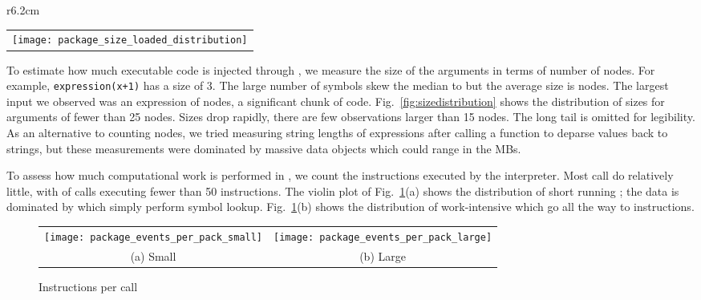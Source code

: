 \documentclass[review,screen,acmsmall]{acmart}%
\renewcommand{\k}[1]{\lstinline |#1|\xspace}
\begin{document}
\begin{wrapfigure}{r}{6.2cm}
\begin{tabular}{c}
{\hspace{-25mm}\texttt{[image: package\_size\_loaded\_distribution]}}
\end{tabular}
\caption{Loaded code} \label{fig:sizedistribution}
\end{wrapfigure}

To estimate how much executable code is injected through \eval, we measure the
size of the arguments in terms of number of nodes. For example,
\k{expression(x+1)} has a size of 3. The large number of symbols skew the median
to \packageMedianszeval but the average size is \packageAvgszeval nodes. The
largest \eval input we observed was an expression of \packageMaxszeval nodes, a
significant chunk of code. Fig.~\ref{fig:sizedistribution} shows the
distribution of sizes for arguments of fewer than 25 nodes. Sizes drop rapidly,
there are few observations larger than 15 nodes. The long tail is omitted for
legibility. As an alternative to counting nodes, we tried measuring string
lengths of expressions after calling a function to deparse values back to
strings, but these measurements were dominated by massive data objects which
could range in the MBs.

To assess how much computational work is performed in \evals, we count the
instructions executed by the interpreter. Most call do relatively little, with
\packageSmalleventspct of calls executing fewer than 50 instructions. The violin
plot of Fig.~\ref{ev}(a) shows the distribution of short running \evals; the
data is dominated by \evals which simply perform symbol lookup. Fig.~\ref{ev}(b)
shows the distribution of work-intensive \evals which go all the way to
\packageMaxeventsRnd instructions.

\begin{figure}[h!]
\begin{tabular}{@{}c@{}c@{}}
\begin{minipage}{7.5cm}
 \texttt{[image: package\_events\_per\_pack\_small]}
\end{minipage}&\begin{minipage}{7.5cm}
  \texttt{[image: package\_events\_per\_pack\_large]}
\end{minipage}\\[-3mm]
\small (a) Small & \small (b) Large
\end{tabular}
 \caption{Instructions per call} \label{ev}
\end{figure}
\end{document}
